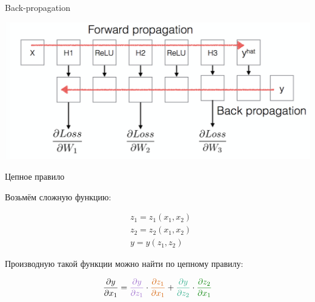 \documentclass[notes,12pt, aspectratio=169]{beamer}
\newenvironment{wideitemize}{\itemize\addtolength{\itemsep}{10pt}}{\enditemize}
\begin{document}
\begin{frame}{Back-propagation}
	\begin{center}
		\includegraphics[width=.8\linewidth]{backpropagation.png}
	\end{center}
\end{frame}


\begin{frame}{Цепное правило}
	\begin{wideitemize}
		\item  Возьмём сложную функцию: 
		
		\begin{equation*}
		\begin{aligned}
		& z_1 = z_1(x_1, x_2) \\  & z_2 = z_2(x_1, x_2) \\  & y = y(z_1, z_2)
		\end{aligned}
		\end{equation*} 
		
		\item Производную такой функции можно найти по цепному правилу: 
		
		$$
		\frac{\partial y}{\partial x_1} = {\color{amethyst} \frac{\partial y}{\partial z_1}} \cdot {\color{red} \frac{\partial z_1}{\partial x_1}} + {\color{junglegreen} \frac{\partial y}{\partial z_2}} \cdot {\color{green} \frac{\partial z_2}{\partial x_1}}
		$$ 
	\end{wideitemize}
\end{frame} 
\end{document}
